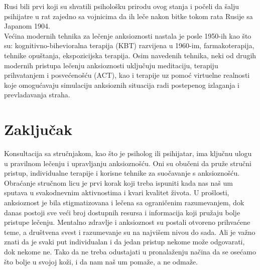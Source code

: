 \documentclass[a4paper]{article}
\begin{document}
            Rusi bili prvi koji su shvatili psihološku prirodu ovog stanja i počeli da šalju psihijatre u rat zajedno sa vojnicima da ih leče nakon bitke tokom rata Rusije sa Japanom 1904. \\

            Većina modernih tehnika za lečenje anksioznosti nastala je posle 1950-ih kao što su: kognitivno-bihevioralna terapija (KBT) razvijena u 1960-im, farmakoterapija, tehnike opuštanja, ekspozicijska terapija. Osim navedenih tehnika, neki od drugih modernih pristupa lečenju anksioznosti uključuju meditaciju, terapiju prihvatanjem i posvećenošću (ACT), kao i terapije uz pomoć virtuelne realnosti koje omogućavaju simulaciju anksioznih situacija radi postepenog izlaganja i prevladavanja straha. 
		
	

		
		\section{Zaključak}	

            Konsultacija sa stručnjakom, kao što je psiholog ili psihijatar, ima ključnu ulogu u pravilnom lečenju i upravljanju anksioznošću. Oni su obučeni da pruže stručni pristup, individualne terapije i korisne tehnike za suočavanje s anksioznošću. Obraćanje stručnom licu je prvi korak koji treba ispuniti kada nas naš um sputava u svakodnevnim aktivnostima i kvari kvalitet života. U prošlosti, anksioznost je bila stigmatizovana i lečena sa ograničenim razumevanjem, dok danas postoji sve veći broj dostupnih resursa i informacija koji pružaju bolje pristupe lečenju. Mentalno zdravlje i anksioznost su postali otvoreno prihvaćene teme, a društvena svest i razumevanje su na najvišem nivou do sada. Ali je važno znati da je svaki put individualan i da jedan pristup nekome može odgovarati, dok nekome ne. Tako da ne treba odustajati u pronalaženju načina da se osećamo što bolje u svojoj koži, i da nam naš um pomaže, a ne odmaže.


		

		
	

 	\newpage

		\appendix
		
		\iffalse
		 
		
		\fi
		
\end{document}
